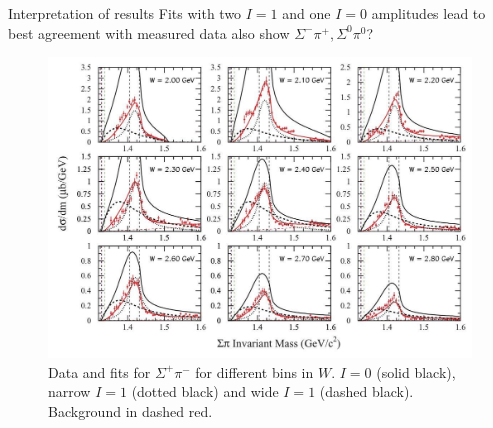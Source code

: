 \documentclass[11pt,aspectratio=1610,dvipsnames]{beamer}
\begin{document}
\begin{frame}{Interpretation of results}
	Fits with two $I=1$ and one $I=0$ amplitudes lead to best agreement with measured data {\color{red} also show $\Sigma^-\pi^+,\Sigma^0\pi^0$?}
	\begin{figure}
		\centering
		\includegraphics[width=.65\linewidth]{iso_result.jpg}
		\caption{Data and fits for $\Sigma^+\pi^-$ for different bins in $W$. $I=0$ (solid black), narrow $I=1$ (dotted black) and wide $I=1$ (dashed black). Background in dashed red. \citet{lineshapes}}
	\end{figure}
	
	
\end{frame}
\end{document}
